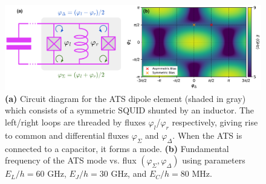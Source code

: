 \begin{figure}[h]
    \centering
    \includegraphics[width=\linewidth]{Figures/5/ats_spectrum.pdf}
    \caption[Circuit diagram and potential energy landscape for the Asymmetrically-Threaded SQUID (ATS) dipole element.]{\textbf{(a)} Circuit diagram for the ATS dipole element (shaded in gray) which consists of a symmetric SQUID shunted by an inductor. The left/right loops are threaded by fluxes $\varphi_l$/$\varphi_r$ respectively, giving rise to common and differential fluxes $\varphi_\Sigma$ and $\varphi_\Delta$. When the ATS is connected to a capacitor, it forms a mode. \textbf{(b)} Fundamental frequency of the ATS mode vs. flux $(\varphi_\Sigma, \varphi_\Delta)$ using parameters $E_L/h = 60$ GHz, $E_J/h = 30$ GHz, and $E_C/h = 80$ MHz.}
    \label{fig:5_ats_spectrum}
\end{figure}

